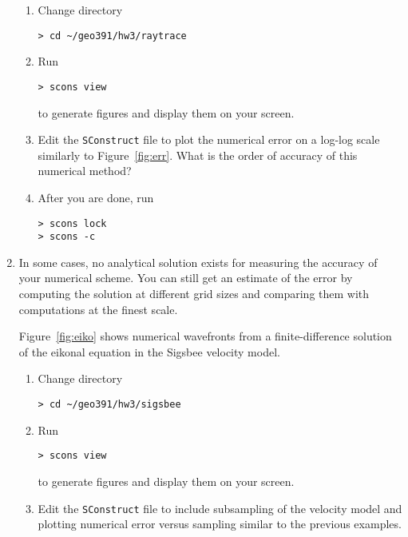 \begin{enumerate}
\begin{enumerate}
  \item Change directory 
\begin{verbatim}
> cd ~/geo391/hw3/raytrace
\end{verbatim}
  \item Run
\begin{verbatim}
> scons view
\end{verbatim}
    to generate figures and display them on your screen.  
  \item Edit the \texttt{SConstruct} file to plot the numerical error
    on a log-log scale similarly to Figure~\ref{fig:err}. What is the
    order of accuracy of this numerical method?

    

  \item After you are done, run
\begin{verbatim}
> scons lock
> scons -c
\end{verbatim} 
  \end{enumerate}
   
\item In some cases, no analytical solution exists for measuring the
  accuracy of your numerical scheme. You can still get an estimate of
  the error by computing the solution at different grid sizes and
  comparing them with computations at the finest scale.


  Figure~\ref{fig:eiko} shows numerical wavefronts from a
  finite-difference solution of the eikonal equation in the Sigsbee
  velocity model.


  \begin{enumerate}    
  \item Change directory 
\begin{verbatim}
> cd ~/geo391/hw3/sigsbee
\end{verbatim}
  \item Run
\begin{verbatim}
> scons view
\end{verbatim}
    to generate figures and display them on your screen.  
  \item Edit the \texttt{SConstruct} file to include subsampling of
    the velocity model and plotting numerical error versus sampling similar to the previous examples.
    

\end{enumerate}
\end{enumerate}
